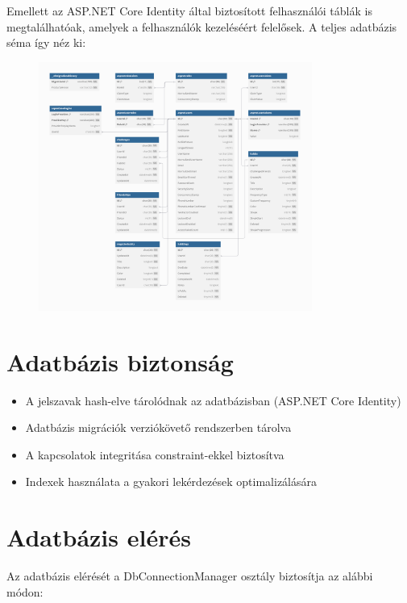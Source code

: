 \documentclass[12pt]{report}
\begin{document}
Emellett az ASP.NET Core Identity által biztosított felhasználói táblák is megtalálhatóak, amelyek a felhasználók kezeléséért felelősek. A teljes adatbázis séma így néz ki:

\begin{figure}[H]
    \centering
    \includegraphics[width=0.8\textwidth, height=0.8\textheight, keepaspectratio]{src/diagram_full.png}
\end{figure}

\section{Adatbázis biztonság}
\begin{itemize}
  \item A jelszavak hash-elve tárolódnak az adatbázisban (ASP.NET Core Identity)
  \item Adatbázis migrációk verziókövető rendszerben tárolva
  \item A kapcsolatok integritása constraint-ekkel biztosítva
  \item Indexek használata a gyakori lekérdezések optimalizálására
\end{itemize}

\section{Adatbázis elérés}
Az adatbázis elérését a DbConnectionManager osztály biztosítja az alábbi módon:
\end{document}
